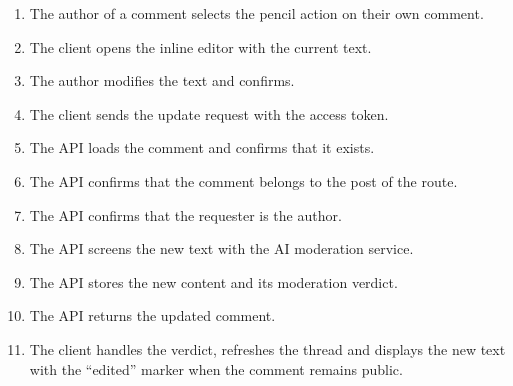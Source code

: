 \begin{enumerate}[leftmargin=1.8em,topsep=3pt,itemsep=2pt,parsep=0pt]
      \item The author of a comment selects the pencil action on their own comment.
      \item The client opens the inline editor with the current text.
      \item The author modifies the text and confirms.
      \item The client sends the update request with the access token.
      \item The API loads the comment and confirms that it exists.
      \item The API confirms that the comment belongs to the post of the route.
      \item The API confirms that the requester is the author.
      \item The API screens the new text with the AI moderation service.
      \item The API stores the new content and its moderation verdict.
      \item The API returns the updated comment.
      \item The client handles the verdict, refreshes the thread and displays the new text
            with the ``edited'' marker when the comment remains public.
\end{enumerate}

